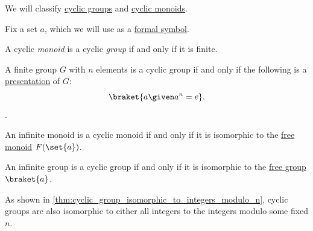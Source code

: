 \begin{proposition}\label{thm:cyclic_monoid_classification}
  We will classify \hyperref[def:cyclic_group]{cyclic groups} and \hyperref[def:cyclic_monoid]{cyclic monoids}.

  Fix a set \( a \), which we will use as a \hyperref[def:formal_language/symbol]{formal symbol}.

  \begin{thmenum}
     A cyclic \emph{monoid} is a cyclic \emph{group} if and only if it is finite.

     A finite group \( G \) with \( n \) elements is a cyclic group if and only if the following is a \hyperref[def:group_presentation]{presentation} of \( G \):
    \begin{equation}\label{eq:thm:cyclic_monoid_classification/finite_group}
      \braket{ a \given a^n = e }.
    \end{equation}.

     An infinite monoid is a cyclic monoid if and only if it is isomorphic to the \hyperref[def:free_monoid]{free monoid} \( F(\set{ a }) \).

     An infinite group is a cyclic group if and only if it is isomorphic to the \hyperref[def:free_group]{free group} \( \braket{ a } \).
  \end{thmenum}
\end{proposition}
\begin{comments}
  \item As shown in \cref{thm:cyclic_group_isomorphic_to_integers_modulo_n}, cyclic groups are also isomorphic to either all integers to the integers modulo some fixed \( n \).
\end{comments}
